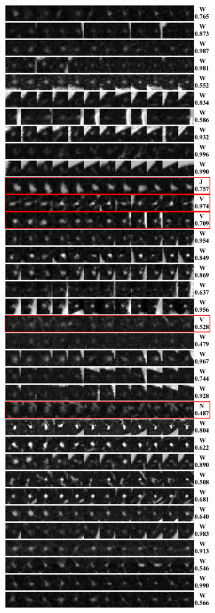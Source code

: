 \documentclass[onecolumn]{IEEEtran}
\begin{document}
\begin{figure}[H]
{\includegraphics[width=0.45\columnwidth]{./images/elcap-msnodules-iso1}
}
\end{figure}
\end{document}
